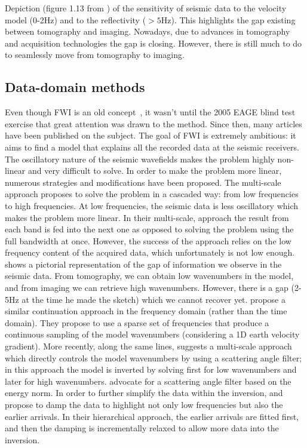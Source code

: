 %
{Depiction (figure 1.13 from \cite{Claerbout:1985:IEI:3887}) of 
 the sensitivity of seismic data to the velocity model (0-2Hz) and to the reflectivity ($> 5$Hz). This highlights
the gap existing between tomography and imaging. Nowadays, due to advances in tomography and acquisition technologies
the gap is closing. However, there is still much to do to seamlessly move from tomography to 
imaging.}



\subsection{Data-domain methods}

Even though FWI is an old concept~\citep{lailly1983seismic,tarantola,
Pratt99,Sirgue,VirieuxFWI}, 
it wasn't until the 2005 EAGE blind test exercise \citep{billette20052004}
that great attention was drawn to the method. Since then, many articles have been 
published on the subject. The goal of FWI 
is extremely ambitious: it aims to find a model that explains all the recorded data
at the seismic receivers. The oscillatory nature of the seismic wavefields makes the problem
highly non-linear and very difficult to solve. In order to make the problem more
linear, numerous strategies and modifications have been proposed. The multi-scale approach \citep{Bunks95}
proposes to solve the problem in a cascaded way: from low frequencies to high frequencies. At low frequencies,
the seismic data is less oscillatory which makes the problem more linear. In their multi-scale, approach 
the result from each band is fed into the next one as opposed to solving the problem using the 
full bandwidth at once. However, the success of the approach relies on the 
low frequency content of the acquired data, which unfortunately is not 
low enough. 
  \citep{Claerbout:1985:IEI:3887} shows a pictorial representation of the gap of 
information we observe in the seismic data.  From tomography, we can obtain
low wavenumbers in the model, and from imaging we can retrieve high wavenumbers. However, there is a 
gap (2-5Hz at the time he made the sketch) which we cannot recover yet. 
 \cite{Sirgue} propose a similar continuation approach in the frequency domain (rather than the time domain). 
They propose to use a sparse set of frequencies that produce a continuous sampling 
of the model wavenumbers  (considering a 1D earth velocity gradient).
 More
recently, along the same lines, \cite{TariqWavenumber} suggests a multi-scale approach which directly controls
the model wavenumbers by using a scattering angle filter; in this approach the model is inverted
by solving first for low wavenumbers and later for high wavenumbers. \cite{Rocha2015elastic} 
advocate for a scattering angle filter based on the energy norm. 
 In order to further simplify the 
data within the inversion, \cite{ShinHa.geo.2008} and \cite{shin_cha} propose to  damp the data
to highlight not only low frequencies but also the earlier arrivals. In their hierarchical 
approach, the earlier arrivals are fitted first, and then the damping is incrementally  relaxed to allow more
data into the inversion. 

